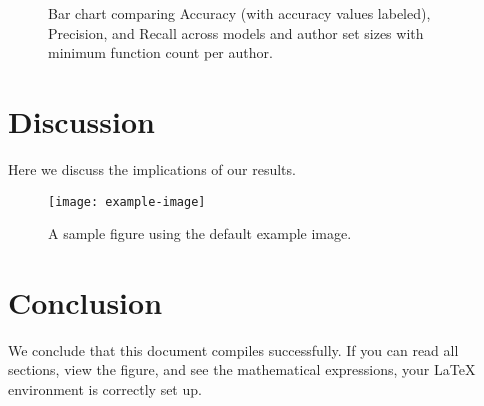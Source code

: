 \documentclass{article}
\begin{document}
\begin{figure}[h!]
\caption{Bar chart comparing Accuracy (with accuracy values labeled), Precision, and Recall across models and author set sizes with minimum function count per author. }
\label{fig:3d-bars-legend-brown}
\end{figure}


\section{Discussion}
Here we discuss the implications of our results. 

\begin{figure}[h]
\centering
\texttt{[image: example-image]} %
\caption{A sample figure using the default example image.}
\end{figure}

\section{Conclusion}
We conclude that this document compiles successfully. If you can read all sections, view the figure, and see the mathematical expressions, your LaTeX environment is correctly set up.
\end{document}
